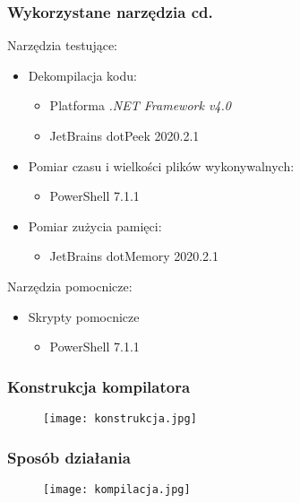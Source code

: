 \begin{frame}
  \frametitle{Wykorzystane narzędzia cd.}
  
  \begin{block}{Narzędzia testujące:}
    \begin{itemize}
      \item  Dekompilacja kodu:
      \begin{itemize}
        \item  Platforma \textit{.NET Framework v4.0}
        \item  JetBrains dotPeek 2020.2.1
      \end{itemize}
      \item  Pomiar czasu i wielkości plików wykonywalnych:
      \begin{itemize}
        \item  PowerShell 7.1.1
      \end{itemize}
      \item  Pomiar zużycia pamięci:
      \begin{itemize}
        \item  JetBrains dotMemory 2020.2.1
      \end{itemize}
    \end{itemize}
  \end{block}
  
  \begin{block}{Narzędzia pomocnicze:}
    \begin{itemize}
      \item  Skrypty pomocnicze
      \begin{itemize}
        \item  PowerShell 7.1.1
      \end{itemize}
  \end{itemize}
  \end{block}
\end{frame}

\begin{frame}
  \frametitle{Konstrukcja kompilatora}
  \begin{figure}[ht]
    \centering
    \texttt{[image: konstrukcja.jpg]}
	\end{figure}
\end{frame}

\begin{frame}
  \frametitle{Sposób działania}
  \begin{figure}[ht]
    \centering
    \texttt{[image: kompilacja.jpg]}
	\end{figure}
\end{frame}

